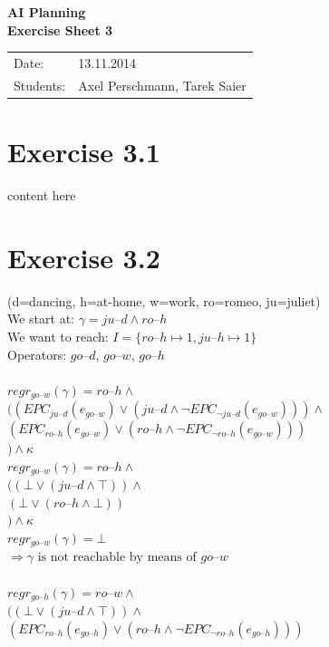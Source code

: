 \documentclass[11pt,a4paper]{article}
\newcommand{\h}[0]{\text{--}}
\begin{document}
\begin{center}
\Huge{\textbf{AI Planning}}\\
\LARGE{\textbf{Exercise Sheet 3}}
\end{center}
\vspace{2cm}
\begin{tabular}{ll}
Date: & 13.11.2014\\
Students: & Axel Perschmann, Tarek Saier
\end{tabular}

\section*{Exercise 3.1}
content here

\section*{Exercise 3.2}
(d=dancing, h=at-home, w=work, ro=romeo, ju=juliet)\\
We start at: $\gamma=ju\h d\land ro\h h$\\
We want to reach: $I=\{ro\h h\mapsto1,ju\h h\mapsto1\}$\\
Operators: $go\h d$, $go\h w$, $go\h h$\\
\\
$regr_{go\h w}(\gamma)=ro\h h\land$\\
\hphantom{aaaa}$((EPC_{ju\h d}(e_{go\h w})\lor (ju\h d\land \neg EPC_{\neg ju\h d}(e_{go\h w})))\land$\\
\hphantom{aaaaaa}$(EPC_{ro\h h}(e_{go\h w})\lor (ro\h h\land \neg EPC_{\neg ro\h h}(e_{go\h w})))$\\
\hphantom{aaaa}$) \land \kappa$\\
$regr_{go\h w}(\gamma)=ro\h h\land$\\
\hphantom{aaaa}$((\bot \lor (ju\h d\land \top))\land$\\
\hphantom{aaaaaa}$(\bot \lor (ro\h h\land \bot))$\\
\hphantom{aaaa}$) \land \kappa$\\
$regr_{go\h w}(\gamma)=\bot$\\
$\Rightarrow \gamma \text{ is not reachable by means of } go\h w$\\
\\
$regr_{go\h h}(\gamma)=ro\h w\land$\\
\hphantom{aaaa}$((\bot \lor (ju\h d\land \top))\land$\\
\hphantom{aaaaaa}$(EPC_{ro\h h}(e_{go\h h})\lor (ro\h h\land \neg EPC_{\neg ro\h h}(e_{go\h h})))$\\
\end{document}
